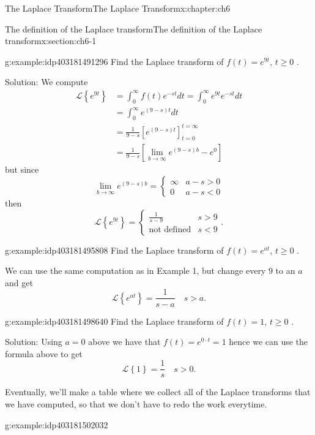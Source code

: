 \documentclass[oneside,10pt,]{book}
\numberwithin{equation}{section}
\numberwithin{equation}{section}
\newcommand{\lt}{<}
\newcommand{\amp}{&}
\begin{document}
\begin{chapterptx}{The Laplace Transform}{}{The Laplace Transform}{}{}{x:chapter:ch6}
\begin{sectionptx}{The definition of the Laplace transform}{}{The definition of the Laplace transform}{}{}{x:section:ch6-1}
\begin{example}{}{g:example:idp403181491296}
Find the Laplace transform of \(f(t)=e^{9t}\), \(t\geq0\) .%
\par
Solution: We compute%
\begin{align*}
\mathcal{L}\left\{ e^{9t}\right\}  \amp =\int_{0}^{\infty}f(t)e^{-st}dt=\int_{0}^{\infty}e^{9t}e^{-st}dt\\
\amp =\int_{0}^{\infty}e^{(9-s)t}dt\\
\amp =\frac{1}{9-s}\left[e^{(9-s)t}\right]_{t=0}^{t=\infty}\\
\amp =\frac{1}{9-s}\left[\lim_{b\to\infty}e^{(9-s)b}-e^{0}\right]
\end{align*}
but since%
\begin{equation*}
\lim_{b\to\infty}e^{(9-s)b}=\begin{cases}
\infty \amp a-s>0\\
0 \amp a-s\lt 0
\end{cases}
\end{equation*}
then%
\begin{equation*}
\mathcal{L}\left\{ e^{9t}\right\} =\begin{cases}
\frac{1}{s-9} \amp s>9\\
\text{not defined} \amp s\lt 9
\end{cases}.
\end{equation*}
%
\end{example}
\begin{example}{}{g:example:idp403181495808}%
Find the Laplace transform of \(f(t)=e^{at}\), \(t\geq0\) .%
\par
We can use the same computation as in Example 1, but change every \(9\) to an \(a\) and get%
\begin{equation*}
\mathcal{L}\left\{ e^{at}\right\} =\frac{1}{s-a}\,\,\,\,\,\,s>a.
\end{equation*}
%
\end{example}
\begin{example}{}{g:example:idp403181498640}%
Find the Laplace transform of \(f(t)=1\), \(t\geq0\) .%
\par
Solution: Using \(a=0\) above we have that \(f(t)=e^{0\cdot t}=1\) hence we can use the formula above to get%
\begin{equation*}
\mathcal{L}\left\{ 1\right\} =\frac{1}{s}\,\,\,\,\,\,s>0.
\end{equation*}
%
\end{example}
Eventually, we'll make a table where we collect all of the Laplace transforms that we have computed, so that we don't have to redo the work everytime.%
\begin{example}{}{g:example:idp403181502032}%

\end{example}
\end{sectionptx}
\end{chapterptx}
\end{document}
